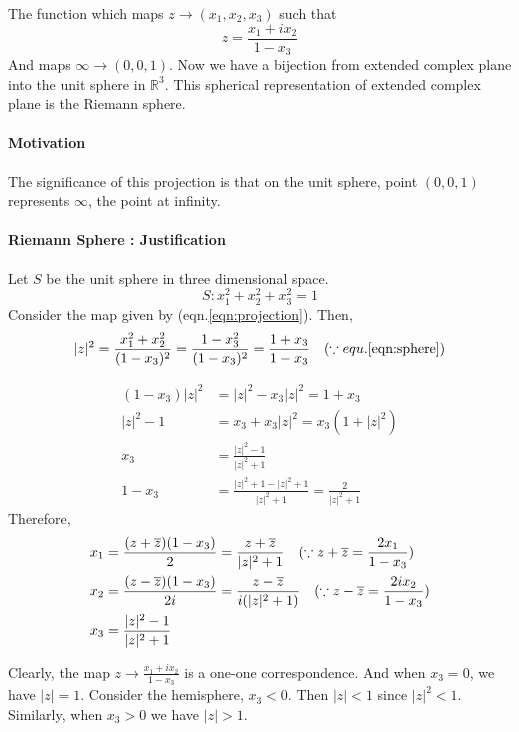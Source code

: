 \begin{definition}
	The function which maps $z \to (x_1,x_2,x_3)$ such that
	\begin{equation}
		z = \frac{x_1+ix_2}{1-x_3}
		\label{eqn:projection}
	\end{equation}
	And maps $\infty \to (0,0,1)$.
	Now we have a bijection from extended complex plane into the unit sphere in $\mathbb{R}^3$.
	This spherical representation of extended complex plane is the Riemann sphere.
\end{definition}

\paragraph{Motivation} The significance of this projection is that on the unit sphere, point $(0,0,1)$ represents $\infty$, the point at infinity.

\paragraph{Riemann Sphere : Justification}
Let $S$ be the unit sphere in three dimensional space.
\begin{equation}
	 S : x_1^2 + x_2^2 + x_3^2 = 1 
	 \label{eqn:sphere}
\end{equation}
Consider the map given by (eqn.\ref{eqn:projection}).
Then,
	\[ |z|^2  = \frac{x_1^2+x_2^2}{(1-x_3)^2} = \frac{1-x_3^2}{(1-x_3)^2} = \frac{1+x_3}{1-x_3}\quad (\because equ. \ref{eqn:sphere}) \]

\begin{align*}
	 (1-x_3)|z|^2 & = |z|^2 - x_3|z|^2 = 1+x_3 \\
	 |z|^2 - 1 & = x_3 + x_3|z|^2 = x_3 (1+|z|^2) \\
	 x_3 & = \frac{|z|^2-1}{|z|^2+1}\\
	 1-x_3 & = \frac{|z|^2+1 - |z|^2+1}{|z|^2+1} = \frac{2}{|z|^2+1} 
\end{align*}
Therefore,
\begin{align}
	 x_1 & = \frac{(z+\overline{z})(1-x_3)}{2} = \frac{z+\overline{z}}{|z|^2+1}\quad (\because z + \overline{z} = \frac{2x_1}{1-x_3}) \\
	 x_2 & = \frac{(z-\overline{z})(1-x_3)}{2i} = \frac{z-\overline{z}}{i(|z|^2+1)}\quad (\because z - \overline{z} = \frac{2ix_2}{1-x_3}) \\
	x_3 & = \frac{|z|^2-1}{|z|^2+1}
\end{align}

Clearly, the map $z \to \displaystyle \frac{x_1+ix_2}{1-x_3}$ is a one-one correspondence.
And when $x_3 = 0$, we have $|z| = 1$.
Consider the hemisphere, $x_3 < 0$.
Then $|z|<1$ since $|z|^2<1$.
Similarly, when $x_3 > 0$ we have $|z|>1$.

